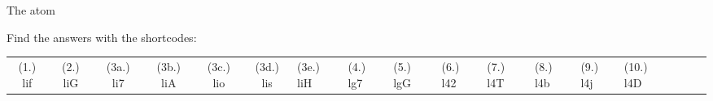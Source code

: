 \begin{eocexercises}{The atom}
\par {} Find the answers with the shortcodes:
 \par \begin{tabular}[h]{cccccc}
 (1.) lif  &  (2.) liG  &  (3a.) li7  &  (3b.) liA  &  (3c.) lio  &  (3d.) lis  &  (3e.) liH  &  (4.) lg7  &  (5.) lgG  &  (6.) l42  &  (7.) l4T  &  (8.) l4b  &  (9.) l4j  &  (10.) l4D  &  & &  & \end{tabular}

\end{eocexercises}
